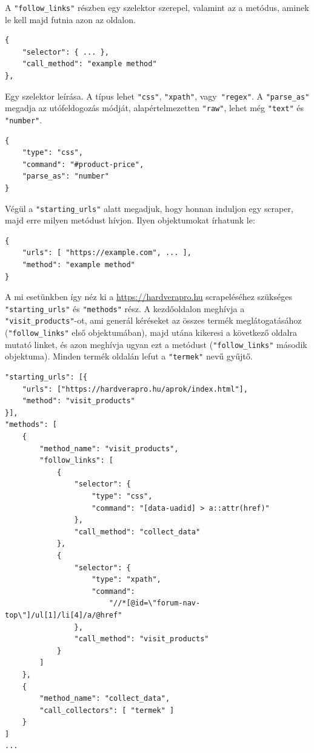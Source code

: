 \documentclass[10pt]{article}
\begin{document}
A \lstinline{"follow_links"} részben egy szelektor szerepel, valamint az a metódus, aminek le kell majd futnia azon az oldalon. 
\begin{lstlisting}[frame=single]
{
    "selector": { ... },
    "call_method": "example method"
},
\end{lstlisting}


Egy szelektor leírása. A típus lehet \lstinline{"css"}, \lstinline{"xpath"}, vagy\lstinline{ "regex"}. A \lstinline{"parse_as"} megadja az utófeldogozás módját, alapértelmezetten \lstinline{"raw"}, lehet még \lstinline{"text"} és \lstinline{"number"}.
\begin{lstlisting}[frame=single]
{
    "type": "css",
    "command": "#product-price", 
    "parse_as": "number"
}
\end{lstlisting}

Végül a \lstinline{"starting_urls"} alatt megadjuk, hogy honnan induljon egy scraper, majd erre milyen metódust hívjon. Ilyen objektumokat írhatunk le:
\begin{lstlisting}[frame=single]
{
    "urls": [ "https://example.com", ... ],
    "method": "example method"
}
\end{lstlisting}

A mi esetünkben így néz ki a \url{https://hardverapro.hu} scrapeléséhez szükséges \lstinline{"starting_urls"} és \lstinline{"methods"} rész. A kezdőoldalon meghívja a \lstinline{"visit_products"}-ot, ami generál kéréseket az összes termék meglátogatásához (\lstinline{"follow_links"} első objektumában), majd utána kikeresi a következő oldalra mutató linket, és azon meghívja ugyan ezt a metódust (\lstinline{"follow_links"} második objektuma). Minden termék oldalán lefut a \lstinline{"termek"} nevű gyűjtő.
\begin{lstlisting}[frame=single]
"starting_urls": [{
    "urls": ["https://hardverapro.hu/aprok/index.html"],
    "method": "visit_products"
}],
"methods": [
    {
        "method_name": "visit_products",
        "follow_links": [
            {
                "selector": {
                    "type": "css",
                    "command": "[data-uadid] > a::attr(href)"
                },
                "call_method": "collect_data"
            },
            {
                "selector": {
                    "type": "xpath",
                    "command":
                        "//*[@id=\"forum-nav-top\"]/ul[1]/li[4]/a/@href"
                },
                "call_method": "visit_products"
            }
        ]
    },
    {
        "method_name": "collect_data",
        "call_collectors": [ "termek" ]
    }
]
...
\end{lstlisting}
\end{document}
